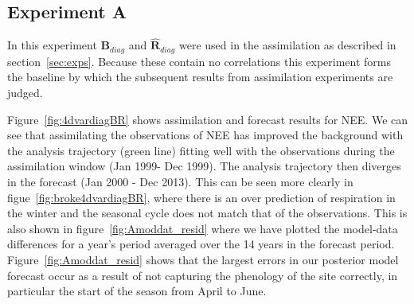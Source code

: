 \documentclass[review]{elsarticle}
\begin{document}
\subsection{Experiment A} \label{sec:expa}
In this experiment $\textbf{B}_{diag}$ and $\hat{\textbf{R}}_{diag}$ were used in the assimilation as described in section~\ref{sec:exps}. Because these contain no correlations this experiment forms the baseline by which the subsequent results from assimilation experiments are judged.  

Figure~\ref{fig:4dvardiagBR} shows assimilation and forecast results for NEE. We can see that assimilating the observations of NEE has improved the background with the analysis trajectory (green line) fitting well with the observations during the assimilation window (Jan 1999- Dec 1999). The analysis trajectory then diverges in the forecast (Jan 2000 - Dec 2013). This can be seen more clearly in figue~\ref{fig:broke4dvardiagBR}, where there is an over prediction of respiration in the winter and the seasonal cycle does not match that of the observations. This is also shown in figure~\ref{fig:Amoddat_resid} where we have plotted the model-data differences for a year's period averaged over the 14 years in the forecast period. Figure~\ref{fig:Amoddat_resid} shows that the largest errors in our posterior model forecast occur as a result of not capturing the phenology of the site correctly, in particular the start of the season from April to June.
 
\end{document}
